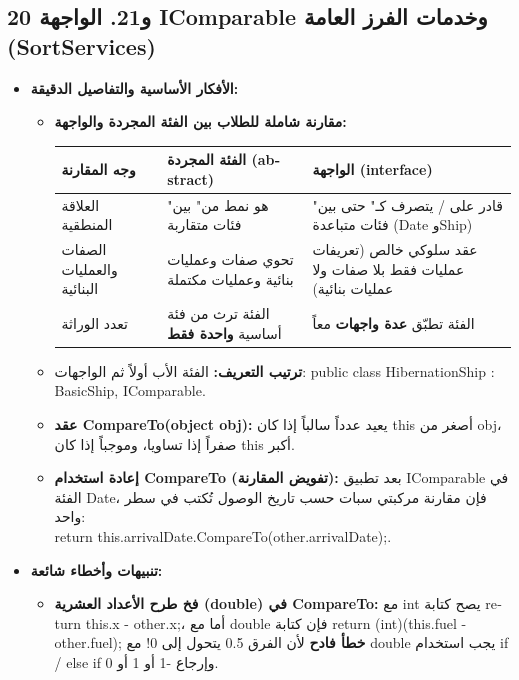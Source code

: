 \documentclass[14pt]{extarticle}
\begin{document}
\filbreak
\subsection*{20 و21. الواجهة \textenglish{IComparable} وخدمات الفرز العامة (\textenglish{SortServices})}
\begin{itemize}[itemsep=0.3em]
    \item \textbf{الأفكار الأساسية والتفاصيل الدقيقة:}
    \begin{itemize}
        \item \textbf{مقارنة شاملة للطلاب بين الفئة المجردة والواجهة:}
        \begin{center}
        \renewcommand{\arraystretch}{1.25}
        {\small
        \begin{tabular}{|p{}|p{}|p{}|}
        \hline
        \textbf{وجه المقارنة} & \textbf{الفئة المجردة (\textenglish{abstract})} & \textbf{الواجهة (\textenglish{interface})} \\
        \hline
        العلاقة المنطقية & "هو نمط من" بين فئات متقاربة & "قادر على / يتصرف كـ" حتى بين فئات متباعدة (\textenglish{Date} و\textenglish{Ship}) \\
        \hline
        الصفات والعمليات البنائية & تحوي صفات وعمليات بنائية وعمليات مكتملة & عقد سلوكي خالص (تعريفات عمليات فقط بلا صفات ولا عمليات بنائية) \\
        \hline
        تعدد الوراثة & الفئة ترث من فئة أساسية \textbf{واحدة فقط} & الفئة تطبّق \textbf{عدة واجهات} معاً \\
        \hline
        \end{tabular}
        }
        \end{center}
        \item \textbf{ترتيب التعريف:} الفئة الأب أولاً ثم الواجهات: \textenglish{public class HibernationShip : BasicShip, IComparable}.
        \item \textbf{عقد \textenglish{CompareTo(object obj)}:} يعيد عدداً سالباً إذا كان \textenglish{this} أصغر من \textenglish{obj}، صفراً إذا تساويا، وموجباً إذا كان \textenglish{this} أكبر.
        \item \textbf{إعادة استخدام \textenglish{CompareTo} (تفويض المقارنة):} بعد تطبيق \textenglish{IComparable} في الفئة \textenglish{Date}، فإن مقارنة مركبتي سبات حسب تاريخ الوصول تُكتب في سطر واحد: \\
        \textenglish{return this.arrivalDate.CompareTo(other.arrivalDate);}.
    \end{itemize}
    \item \textbf{تنبيهات وأخطاء شائعة:}
    \begin{itemize}
        \item \textbf{فخ طرح الأعداد العشرية (\textenglish{double}) في \textenglish{CompareTo}:} مع \textenglish{int} يصح كتابة \textenglish{return this.x - other.x;}، أما مع \textenglish{double} فإن كتابة \textenglish{return (int)(this.fuel - other.fuel);} \textbf{خطأ فادح} لأن الفرق \textenglish{0.5} يتحول إلى \textenglish{0}! مع \textenglish{double} يجب استخدام \textenglish{if / else if} وإرجاع \textenglish{-1} أو \textenglish{1} أو \textenglish{0}.
    \end{itemize}
\end{itemize}
\end{document}
